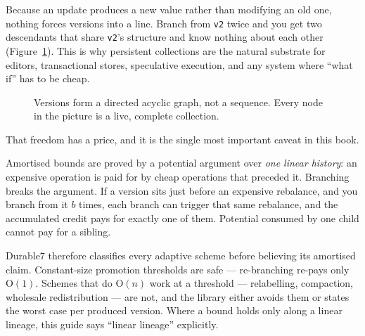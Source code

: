 \documentclass[11pt,twoside,openright]{book}
\newcommand{\code}[1]{\texorpdfstring{\textcolor{d7ink}{\texttt{#1}}}{#1}}
\newcommand{\bigoh}[1]{$\mathrm{O}(#1)$}
\begin{document}
Because an update produces a new value rather than modifying an old one, nothing
forces versions into a line. Branch from \code{v2} twice and you get two
descendants that share \code{v2}'s structure and know nothing about each other
(Figure~\ref{fig:versiondag}). This is why persistent collections are the natural
substrate for editors, transactional stores, speculative execution, and any
system where ``what if'' has to be cheap.

\begin{figure}[htbp]
\centering
{}
\caption{Versions form a directed acyclic graph, not a sequence. Every node in
the picture is a live, complete collection.}
\label{fig:versiondag}
\end{figure}

That freedom has a price, and it is the single most important caveat in this
book.

\begin{caveatbox}
Amortised bounds are proved by a potential argument over \emph{one linear
history}: an expensive operation is paid for by cheap operations that preceded
it. Branching breaks the argument. If a version sits just before an expensive
rebalance, and you branch from it $b$ times, each branch can trigger that same
rebalance, and the accumulated credit pays for exactly one of them. Potential
consumed by one child cannot pay for a sibling.

Durable7 therefore classifies every adaptive scheme before believing its
amortised claim. Constant-size promotion thresholds are safe --- re-branching
re-pays only \bigoh{1}. Schemes that do \bigoh{n} work at a threshold ---
relabelling, compaction, wholesale redistribution --- are not, and the library
either avoids them or states the worst case per produced version. Where a bound
holds only along a linear lineage, this guide says ``linear lineage''
explicitly.
\end{caveatbox}
\end{document}
